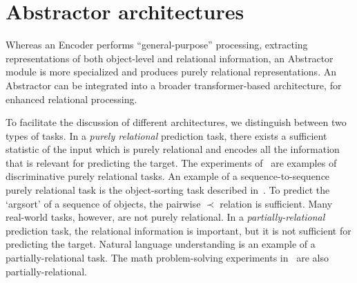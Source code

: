 \section{Abstractor architectures}\label{sec:abstractor_architectures}


Whereas an Encoder performs ``general-purpose'' processing, extracting representations of both object-level and relational information, an Abstractor module is more specialized and produces purely relational representations. An Abstractor can be integrated into a broader transformer-based architecture, for enhanced relational processing.

To facilitate the discussion of different architectures, we distinguish between two types of tasks. In a \textit{purely relational} prediction task, there exists a sufficient statistic of the input which is purely relational and encodes all the information that is relevant for predicting the target. The experiments of~\citep{esbn,kerg2022neural} are examples of discriminative purely relational tasks. An example of a sequence-to-sequence purely relational task is the object-sorting task described in~. To predict the `argsort' of a sequence of objects, the pairwise $\prec$ relation is sufficient. Many real-world tasks, however, are not purely relational. In a \textit{partially-relational} prediction task, the relational information is important, but it is not sufficient for predicting the target. Natural language understanding is an example of a partially-relational task. The math problem-solving experiments in~ are also partially-relational.

